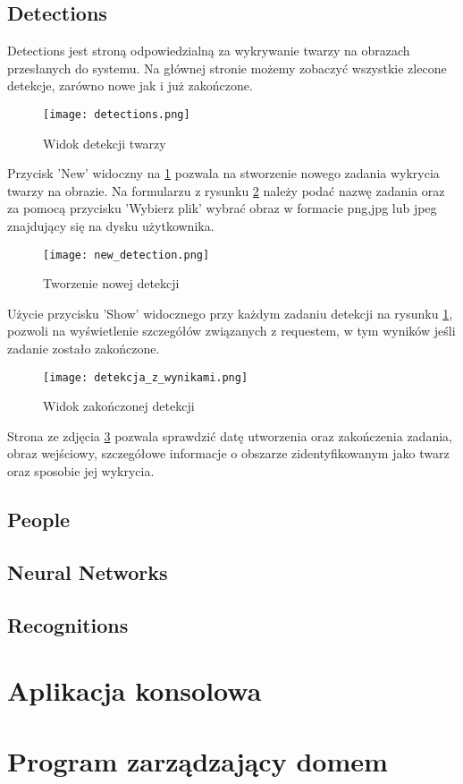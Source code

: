 \subsection{Detections}
Detections jest stroną odpowiedzialną za wykrywanie twarzy na obrazach przesłanych do systemu. Na głównej stronie możemy zobaczyć wszystkie zlecone detekcje, zarówno nowe jak i już zakończone.
\begin{figure}[H]
	\centering
	\texttt{[image: detections.png]}
	\caption{Widok detekcji twarzy}
	\label{fig:detections}
\end{figure}
Przycisk 'New' widoczny na \ref{fig:detections} pozwala na stworzenie nowego zadania wykrycia twarzy na obrazie. Na formularzu z rysunku \ref{fig:new_detection} należy podać nazwę zadania oraz za pomocą przycisku 'Wybierz plik' wybrać obraz w formacie png,jpg lub jpeg znajdujący się na dysku użytkownika.
\begin{figure}[H]
	\centering
	\texttt{[image: new\_detection.png]}
	\caption{Tworzenie nowej detekcji}
	\label{fig:new_detection}
\end{figure}
Użycie przycisku 'Show' widocznego przy każdym zadaniu detekcji na rysunku \ref{fig:detections}, pozwoli na wyświetlenie szczegółów związanych z requestem, w tym wyników jeśli zadanie zostało zakończone.
\begin{figure}[H]
	\centering
	\texttt{[image: detekcja\_z\_wynikami.png]}
	\caption{Widok zakończonej detekcji}
	\label{fig:detekcja_zakonczona}
\end{figure}
Strona ze zdjęcia \ref{fig:detekcja_zakonczona} pozwala sprawdzić datę utworzenia oraz zakończenia zadania, obraz wejściowy, szczegółowe informacje o obszarze zidentyfikowanym jako twarz oraz sposobie jej wykrycia.
\subsection{People}
\subsection{Neural Networks}
\subsection{Recognitions}
\section{Aplikacja konsolowa}
\section{Program zarządzający domem}